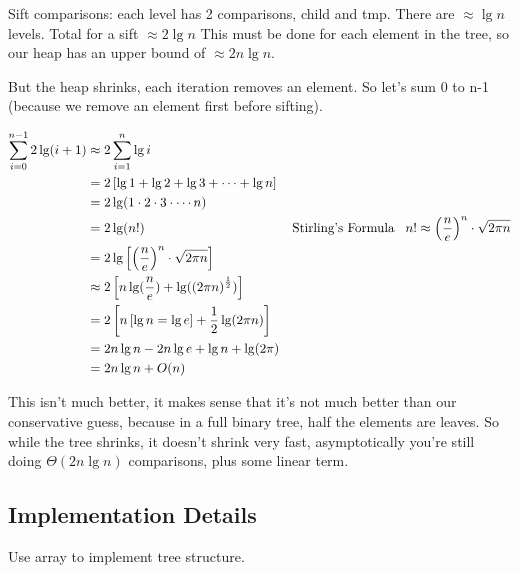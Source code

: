 \documentclass[english, 10pt]{article}
\begin{document}
Sift comparisons: each level has 2 comparisons, child and tmp. There are
$\approx \lg n $ levels. Total for a sift $\approx 2 \lg n$ This must be done
for each element in the tree, so our heap has an upper bound of $\approx 2n \lg
n$.

But the heap shrinks, each iteration removes an element. So let's sum 0 to n-1
(because we remove an element first before sifting).

\begin{align*}
\sum_{i=0}^{n-1}2 \lg (i+1) &\approx 2\sum_{i=1}^{n}\lg i \\
&=2\left[ \lg 1 + \lg 2 + \lg 3 + \cdots + \lg n \right]\\
&=2 \lg( 1\cdot2\cdot3\cdot\cdots n) \\
&=2 \lg(n!) &\text{Stirling's Formula}\;\;\; n! \approx {\left( \frac{n}{e} \right)}^n \cdot \sqrt{2\pi n} \\
&=2\lg\left[{\left( \frac{n}{e} \right)}^n \cdot \sqrt{2\pi n} \right] \\
&\approx 2\left[ n \lg(\frac{n}{e})+\lg({(2\pi n)}^{\frac{1}{2}}) \right] \\
&= 2\left[ n\left[ \lg n = \lg e \right]+ \frac{1}{2}\lg(2\pi n) \right] \\
&=2n\lg n -2n\lg e + \lg n + \lg(2\pi) \\
&=2n\lg n + O(n)
\end{align*}

This isn't much better, it makes sense that it's not much better than our
conservative guess, because in a full binary tree, half the elements are
leaves. So while the tree shrinks, it doesn't shrink very fast, asymptotically
you're still doing $\Theta(2n\lg n)$ comparisons, plus some linear term.

\subsection{Implementation Details}
Use array to implement tree structure.

\end{document}
